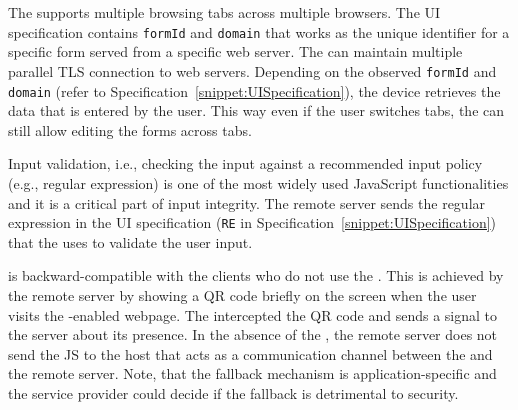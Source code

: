 The \device supports multiple browsing tabs across multiple browsers. The UI specification contains \texttt{formId} and \texttt{domain} that works as the unique identifier for a specific form served from a specific web server. The \device can maintain multiple parallel TLS connection to web servers. Depending on the observed \texttt{formId} and \texttt{domain} (refer to Specification~\ref{snippet:UISpecification}), the device retrieves the data that is entered by the user. This way even if the user switches tabs, the \device can still allow editing the forms across tabs.

 Input validation, i.e., checking the input against a recommended input policy (e.g., regular expression) is one of the most widely used JavaScript functionalities and it is a critical part of input integrity. The remote server sends the regular expression in the UI specification (\texttt{RE} in Specification~\ref{snippet:UISpecification}) that the \device uses to validate the user input.


 \name is backward-compatible with the clients who do not use the \device. This is achieved by the remote server by showing a QR code briefly on the screen when the user visits the \name-enabled webpage. The \device intercepted the QR code and sends a signal to the server about its presence. In the absence of the \device, the remote server does not send the \name JS to the host that acts as a communication channel between the \device and the remote server. Note, that the fallback mechanism is application-specific and the service provider could decide if the fallback is detrimental to security.